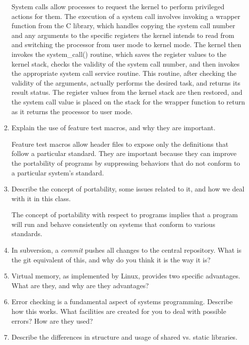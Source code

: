 \documentclass[letterpaper,10pt,onecolumn,titlepage]{article}
\begin{document}
\begin{enumerate}[itemsep=0.1 in]
System calls allow processes to request the kernel to perform privileged actions for them. The execution of a system call involves invoking a wrapper function from the C library, which handles copying the system call number and any arguments to the specific registers the kernel intends to read from and switching the processor from user mode to kernel mode.  The kernel then invokes the system\_call() routine, which saves the register values to the kernel stack, checks the validity of the system call number, and then invokes the appropriate system call service routine.  This routine, after checking the validity of the arguments, actually performs the desired task, and returns its result status.  The register values from the kernel stack are then restored, and the system call value is placed on the stack for the wrapper function to return as it returns the processor to user mode.

\item Explain the use of feature test macros, and why they are important.

Feature test macros allow header files to expose only the definitions that follow a particular standard.  They are important because they can improve the portability of programs by suppressing behaviors that do not conform to a particular system's standard.

\item Describe the concept of portability, some issues related to it, and how we deal
  with it in this class.

  The concept of portability with respect to programs implies that a program will run and behave consistently on systems that conform to various standards.

\item In subversion, a \emph{commit} pushes all changes to the central repository. What
  is the git equivalent of this, and why do you think it is the way it is?

\item Virtual memory, as implemented by Linux, provides two specific advantages. What are
  they, and why are they advantages?

\item Error checking is a fundamental aspect of systems programming. Describe how this
  works. What facilities are created for you to deal with possible errors? How are they
  used?

\item Describe the differences in structure and usage of shared vs. static libraries.


\end{enumerate}
\end{document}

